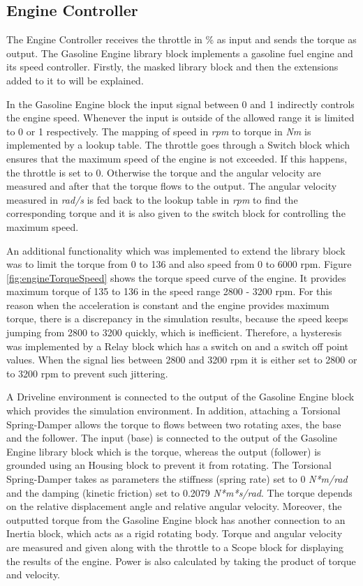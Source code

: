 \subsection{Engine Controller}
The Engine Controller receives the throttle in \% as input and sends the torque as output. The Gasoline Engine library block implements a gasoline fuel engine and its speed controller. Firstly, the masked library block and then the extensions added to it to will be explained.

In the Gasoline Engine block the input signal between 0 and 1 indirectly controls the engine speed. Whenever the input is outside of the allowed range it is limited to 0 or 1 respectively. The mapping of speed in \textit{rpm} to torque in \textit{Nm} is implemented by a lookup table. The throttle goes through a Switch block which ensures that the maximum speed of the engine is not exceeded. If this happens, the throttle is set to 0. Otherwise the torque and the angular velocity are measured and after that the torque flows to the output. The angular velocity measured in \textit{rad/s} is fed back to the lookup table in \textit{rpm} to find the corresponding torque and it is also given to the switch block for controlling the maximum speed.

An additional functionality which was implemented to extend the library block was to limit the torque from 0 to 136 and also speed from 0 to 6000 rpm. Figure \ref{fig:engineTorqueSpeed} shows the torque speed curve of the engine. It provides maximum torque of 135 to 136 in the speed range 2800 - 3200 rpm. For this reason when the acceleration is constant and the engine provides maximum torque, there is a discrepancy in the simulation results, because the speed keeps jumping from 2800 to 3200 quickly, which is inefficient. Therefore, a hysteresis was implemented by a Relay block which has a switch on and a switch off point values. When the signal lies between 2800 and 3200 rpm it is either set to 2800 or to 3200 rpm to prevent such jittering.

A Driveline environment is connected to the output of the Gasoline Engine block which provides the simulation environment. In addition, attaching a Torsional Spring-Damper \citep{tsdMatlab} allows the torque to flows between two rotating axes, the base and the follower. The input (base) is connected to the output of the Gasoline Engine library block which is the torque, whereas the output (follower) is grounded using an Housing block to prevent it from rotating. The Torsional Spring-Damper takes as parameters the stiffness (spring rate) set to 0 \textit{N*m/rad} and the damping (kinetic friction) set to 0.2079 \textit{N*m*s/rad}. The torque depends on the relative displacement angle and relative angular velocity. Moreover, the outputted torque from the Gasoline Engine block has another connection to an Inertia block, which acts as a rigid rotating body. Torque and angular velocity are measured and given along with the throttle to a Scope block for displaying the results of the engine. Power is also calculated by taking the product of torque and velocity.

